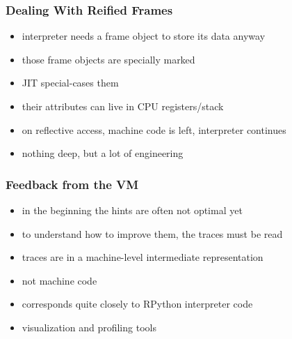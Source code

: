 \documentclass[utf8x]{beamer}
\begin{document}
\begin{frame}
  \frametitle{Dealing With Reified Frames}
  \begin{itemize}
      \item interpreter needs a frame object to store its data anyway
      \item those frame objects are specially marked
      \item JIT special-cases them
      \item their attributes can live in CPU registers/stack
      \item on reflective access, machine code is left, interpreter continues
      \pause
      \item nothing deep, but a lot of engineering
  \end{itemize}
\end{frame}

\begin{frame}
  \frametitle{Feedback from the VM}
  \begin{itemize}
      \item in the beginning the hints are often not optimal yet
      \item to understand how to improve them, the traces must be read
      \item traces are in a machine-level intermediate representation
      \item not machine code
      \item corresponds quite closely to RPython interpreter code
      \item visualization and profiling tools
  \end{itemize}
\end{frame}
\end{document}
